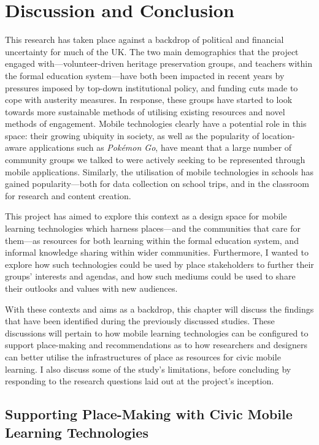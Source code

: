 \chapter{Discussion and Conclusion}

This research has taken place against a backdrop of political and financial uncertainty for much of the UK. The two main demographics that the project engaged with---volunteer-driven heritage preservation groups, and teachers within the formal education system---have both been impacted in recent years by pressures imposed by top-down institutional policy, and funding cuts made to cope with austerity measures. In response, these groups have started to look towards more sustainable methods of utilising existing resources and novel methods of engagement. Mobile technologies clearly have a potential role in this space: their growing ubiquity in society, as well as the popularity of location-aware applications such as \textit{Pok\'emon Go}, have meant that a large number of community groups we talked to were actively seeking to be represented through mobile applications. Similarly, the utilisation of mobile technologies in schools has gained popularity---both for data collection on school trips, and in the classroom for research and content creation.

This project has aimed to explore this context as a design space for mobile learning technologies which harness places---and the communities that care for them---as resources for both learning within the formal education system, and informal knowledge sharing within wider communities. Furthermore, I wanted to explore how such technologies could be used by place stakeholders to further their groups' interests and agendas, and how such mediums could be used to share their outlooks and values with new audiences.

With these contexts and aims as a backdrop, this chapter will discuss the findings that have been identified during the previously discussed studies. These discussions will pertain to how mobile learning technologies can be configured to support place-making and recommendations as to how researchers and designers can better utilise the infrastructures of place as resources for civic mobile learning. I also discuss some of the study's limitations, before concluding by responding to the research questions laid out at the project's inception.


\section{Supporting Place-Making with Civic Mobile Learning Technologies}


